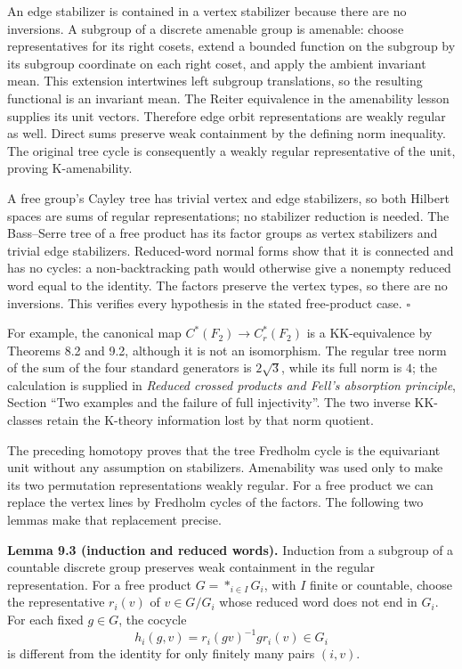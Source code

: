 \documentclass[
  11pt,
]{article}
\begin{document}
An edge stabilizer is contained in a vertex stabilizer because there are
no inversions. A subgroup of a discrete amenable group is amenable:
choose representatives for its right cosets, extend a bounded function
on the subgroup by its subgroup coordinate on each right coset, and
apply the ambient invariant mean. This extension intertwines left
subgroup translations, so the resulting functional is an invariant mean.
The Reiter equivalence in the amenability lesson supplies its unit
vectors. Therefore edge orbit representations are weakly regular as
well. Direct sums preserve weak containment by the defining norm
inequality. The original tree cycle is consequently a weakly regular
representative of the unit, proving K-amenability.

A free group's Cayley tree has trivial vertex and edge stabilizers, so
both Hilbert spaces are sums of regular representations; no stabilizer
reduction is needed. The Bass--Serre tree of a free product has its
factor groups as vertex stabilizers and trivial edge stabilizers.
Reduced-word normal forms show that it is connected and has no cycles: a
non-backtracking path would otherwise give a nonempty reduced word equal
to the identity. The factors preserve the vertex types, so there are no
inversions. This verifies every hypothesis in the stated free-product
case. \(\square\)

For example, the canonical map \(C^*(F_2)\to C_r^*(F_2)\) is a
KK-equivalence by Theorems 8.2 and 9.2, although it is not an
isomorphism. The regular tree norm of the sum of the four standard
generators is \(2\sqrt3\), while its full norm is \(4\); the calculation
is supplied in \emph{Reduced crossed products and Fell's absorption
principle}, Section ``Two examples and the failure of full
injectivity''. The two inverse KK-classes retain the K-theory
information lost by that norm quotient.

The preceding homotopy proves that the tree Fredholm cycle is the
equivariant unit without any assumption on stabilizers. Amenability was
used only to make its two permutation representations weakly regular.
For a free product we can replace the vertex lines by Fredholm cycles of
the factors. The following two lemmas make that replacement precise.

\textbf{Lemma 9.3 (induction and reduced words).} Induction from a
subgroup of a countable discrete group preserves weak containment in the
regular representation. For a free product \(G=*_{i\in I}G_i\), with
\(I\) finite or countable, choose the representative \(r_i(v)\) of
\(v\in G/G_i\) whose reduced word does not end in \(G_i\). For each
fixed \(g\in G\), the cocycle \[
h_i(g,v)=r_i(gv)^{-1}g r_i(v)\in G_i
\tag{9.8}
\] is different from the identity for only finitely many pairs
\((i,v)\).
\end{document}
